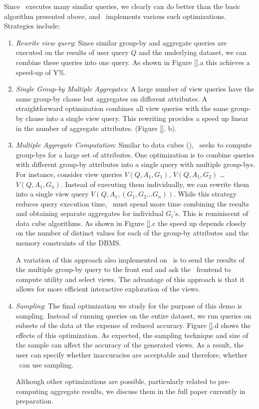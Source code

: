 Since \SeeDB\ executes many similar queries, we clearly can do better than
the basic algorithm presented above, and \SeeDB\ implements various such
optimizations. Strategies include:

\begin{enumerate}
  \item {\it Rewrite view query}: Since similar group-by and aggregate queries
  are executed on the results of user query $Q$ and the underlying dataset, we
  can combine these queries into one query. As shown in Figure \ref{}.a this
  achieves a speed-up of Y\%.
  \item {\it Single Group-by Multiple Aggregates}: A large number of view
  queries have the same group-by clause but aggregates on different attributes.
  A straightforward optimization combines all view queries with the same
  group-by clause into a single view query. This rewriting provides a speed up
  linear in the number of aggregate attributes. (Figure \ref{}. b).
  \item {\it Multiple Aggregate Computation}: Similar to data cubes (\cite{}),
  \SeeDB\ seeks to compute group-bys for a large set of attributes. One
  optimization is to combine queries with different group-by attributes into a
  single query with multiple group-bys. For instance, consider view queries
  $V(Q, A_1, G_1)$, $V(Q, A_1, G_2)$ \ldots $V(Q, A_1, G_n)$. Instead of
  executing them individually, we can rewrite them into a single view query
  $V(Q, A_1, (G_1, G_2\ldots G_n))$. While this strategy reduces query
  execution time, \SeeDB\ must spend more time combining the results and
  obtaining separate aggregates for individual $G_i$'s. This is reminiscent of
  data cube algorithms. As shown in Figure \ref{}.c the speed up depends closely
  on the number of distinct values for each of the group-by attributes and the
  memory constraints of the DBMS. 
  
  A variation of this approach also implemented
  on \SeeDB\ is to send the results of the multiple group-by query to the front
  end and ask the \SeeDB\ frontend to compute utility and select views. The
  advantage of this approach is that it allows for more efficient interactive
  exploration of the views.
  \item {\it Sampling}: The final optimization we study for the purpose of this
  demo is sampling. Instead of running queries on the entire dataset, we
  run queries on subsets of the data at the expense of reduced accuracy.
  Figure \ref{}.d shows the effects of this optimization. As expected, the
  sampling technique and size of the sample can affect the accuracy of the
  generated views. As a result, the user can specify whether inaccuracies are
  acceptable and therefore, whether \SeeDB\ can use sampling.
  
  Although other optimizations are possible, particularly related to
  pre-computing aggregate results, we discuss them in the full paper currently
  in preparation.
\end{enumerate}

